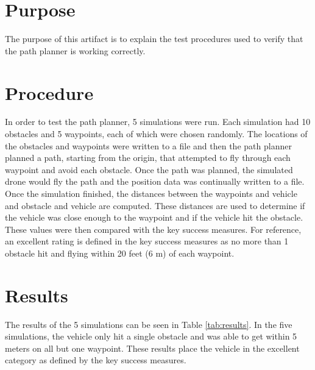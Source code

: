 \documentclass[]{auvsi_doc}
\begin{document}
\begin{AUVSITitlePage}
\begin{artifacttable}
\end{artifacttable}
\end{AUVSITitlePage}

\section*{Purpose}

The purpose of this artifact is to explain the test procedures used to verify that the path planner is working correctly.

\section*{Procedure}

In order to test the path planner, 5 simulations were run. Each simulation had 10 obstacles and 5 waypoints, each of which were chosen randomly.
The locations of the obstacles and waypoints were written to a file and then the path planner planned a path, starting from the origin, that attempted to fly through each waypoint and avoid each obstacle.
Once the path was planned, the simulated drone would fly the path and the position data was continually written to a file. Once the simulation finished, the distances between the waypoints and vehicle and obstacle and vehicle are computed.
These distances are used to determine if the vehicle was close enough to the waypoint and if the vehicle hit the obstacle.
These values were then compared with the key success measures. For reference, an excellent rating is defined in the key success measures as no more than 1 obstacle hit and flying within 20 feet (6 m) of each waypoint.

\section*{Results}

The results of the 5 simulations can be seen in Table \ref{tab:results}. In the five simulations, the vehicle only hit a single obstacle and was able to get within 5 meters on all but one waypoint.
These results place the vehicle in the excellent category as defined by the key success measures.
\end{document}

